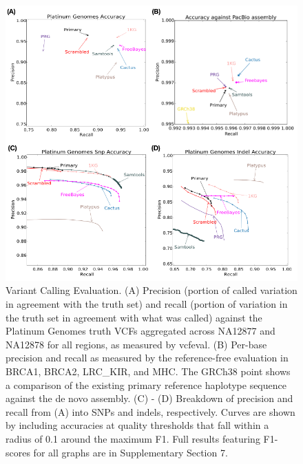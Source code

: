 \begin{figure}[htbp]
\centering
\includegraphics[width=\textwidth]{figures/04_bakeoff/figure04.png}
\caption[Variant calling evaluation]{Variant Calling Evaluation. (A) Precision (portion of called
variation in agreement with the truth set) and recall (portion of
variation in the truth set in agreement with what was called) against
the Platinum Genomes truth VCFs aggregated across NA12877 and NA12878
for all regions, as measured by vcfeval. (B) Per-base precision and
recall as measured by the reference-free evaluation in BRCA1, BRCA2,
LRC\_KIR, and MHC. The GRCh38 point shows a comparison of the existing
primary reference haplotype sequence against the de novo assembly. (C) -
(D) Breakdown of precision and recall from (A) into SNPs and indels,
respectively. Curves are shown by including accuracies at quality
thresholds that fall within a radius of 0.1 around the maximum F1. Full
results featuring F1-scores for all graphs are in Supplementary Section
7.}
\label{fig:bakeoff:callingeval}
\end{figure}

